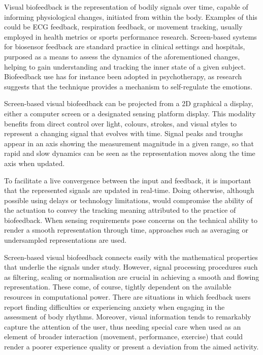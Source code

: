 Visual biofeedback is the representation of bodily signals over time, capable of informing physiological changes, initiated from within the body. Examples of this could be ECG feedback, respiration feedback, or movement tracking, usually employed in health metrics or sports performance research. Screen-based systems for biosensor feedback are standard practice in clinical settings and hospitals, purposed as a means to assess the dynamics of the aforementioned changes, helping to gain understanding and tracking the inner state of a given subject. Biofeedback use has for instance been adopted in psychotherapy, as research suggests that the technique provides a mechanism to self-regulate the emotions.

Screen-based visual biofeedback can be projected from a 2D graphical a display, either a computer screen or a designated sensing platform display. This modality benefits from direct control over light, colours, strokes, and visual styles to represent a changing signal that evolves with time. Signal peaks and troughs appear in an axis showing the measurement magnitude in a given range, so that rapid and slow dynamics can be seen as the representation moves along the time axis when updated.

To facilitate a live convergence between the input and feedback, it is important that the represented signals are updated in real-time. Doing otherwise, although possible using delays or technology limitations, would compromise the ability of the actuation to convey the tracking meaning attributed to the practice of biofeedback. When sensing requirements pose concerns on the technical ability to render a smooth representation through time, approaches such as averaging or undersampled representations are used.

Screen-based visual biofeedback connects easily with the mathematical properties that underlie the signals under study. However, signal processing procedures such as filtering, scaling or normalisation are crucial in achieving a smooth and flowing representation. These come, of course, tightly dependent on the available resources in computational power.
There are situations in which feedback users report finding difficulties or experiencing anxiety when engaging in the assessment of body rhythms. Moreover, visual information tends to remarkably capture the attention of the user, thus needing special care when used as an element of broader interaction (movement, performance, exercise) that could render a poorer experience quality or present a deviation from the aimed activity.

